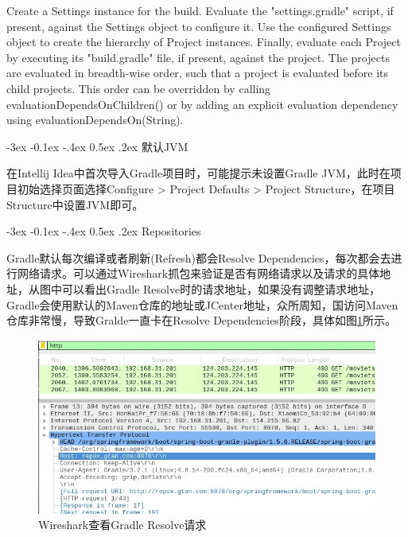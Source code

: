 \documentclass[12pt]{book}
\makeatletter
\numberwithin{dummy}{section}
\theoremstyle{ocrenumbox}
\theoremstyle{blacknumex}
\theoremstyle{blacknumbox}
\theoremstyle{ocrenum}
\renewcommand{\subsection}{\@startsection {subsection}{2}{\z@}
	{-3ex \@plus -0.1ex \@minus -.4ex}
	{0.5ex \@plus.2ex }
	{\normalfont\sffamily\bfseries}}
\makeatother
\begin{document}
Create a Settings instance for the build.
Evaluate the "settings.gradle" script, if present, against the Settings object to configure it.
Use the configured Settings object to create the hierarchy of Project instances.
Finally, evaluate each Project by executing its "build.gradle" file, if present, against the project. The projects are evaluated in breadth-wise order, such that a project is evaluated before its child projects. This order can be overridden by calling evaluationDependsOnChildren() or by adding an explicit evaluation dependency using evaluationDependsOn(String).

\subsection{默认JVM}

在Intellij Idea中首次导入Gradle项目时，可能提示未设置Gradle JVM，此时在项目初始选择页面选择Configure > Project Defaults > Project Structure，在项目Structure中设置JVM即可。

\subsection{Repositories}

Gradle默认每次编译或者刷新(Refresh)都会Resolve Dependencies，每次都会去进行网络请求。可以通过Wireshark抓包来验证是否有网络请求以及请求的具体地址，从图中可以看出Gradle Resolve时的请求地址，如果没有调整请求地址，Gradle会使用默认的Maven仓库的地址或JCenter地址，众所周知，国访问Maven仓库非常慢，导致Gralde一直卡在Resolve Dependencies阶段，具体如图\ref{fig:wiresharkcapturegradlerequest}所示。

\begin{figure}[htbp]
	\centering
	\includegraphics[scale=0.5]{wiresharkcapturegradlerequest.jpg}
	\caption{Wireshark查看Gradle Resolve请求}
	\label{fig:wiresharkcapturegradlerequest}
\end{figure}
\end{document}
